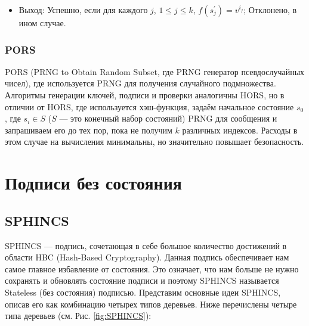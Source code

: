 \documentclass[a4paper, 14pt]{extarticle}
\begin{document}
\begin{itemize}
\begin{itemize}
        \item Выход: Успешно, если для каждого $j$, $1 \leq j \leq k$, $f(s^{'}_{j}) = v^{i_{j}}$; Отклонено, в ином случае.
    \end{itemize}

\end{itemize}

\subsubsection{PORS}
PORS (PRNG to Obtain Random Subset, где PRNG генератор псевдослучайных чисел), где используется PRNG для получения случайного подмножества. Алгоритмы генерации ключей, подписи и проверки аналогичны HORS, но в отличии от HORS, где используется хэш-функция, задаём начальное состояние $s_{0}$, где $s_{i} \in S$ ($S$ --- это конечный набор состояний) PRNG для сообщения и запрашиваем его до тех пор, пока не получим $k$ различных индексов. Расходы в этом случае на вычисления минимальны, но значительно повышает безопасность.

\newpage

\section{Подписи без состояния}
\label{stateless}
\subsection{SPHINCS}
\label{sec_sphincs}
SPHINCS \cite{stateless} --- подпись, сочетающая в себе большое количество достижений в области HBC (Hash-Based Cryptography). Данная подпись обеспечивает нам самое главное избавление от состояния. Это означает, что нам больше не нужно сохранять и обновлять состояние подписи и поэтому SPHINCS называется Stateless (без состояния) подписью.
Представим основные идеи SPHINCS, описав его как комбинацию четырех типов деревьев. Ниже перечислены четыре типа деревьев (см. Рис. \ref{fig:SPHINCS}):
\end{document}
